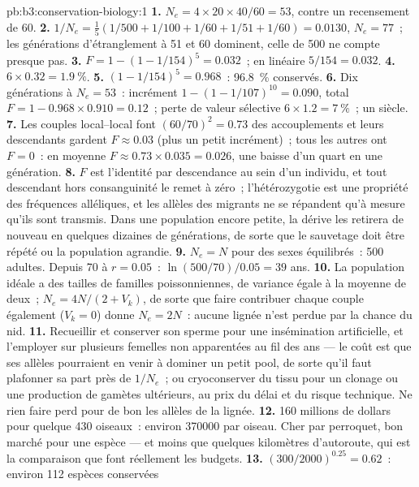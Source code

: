 \begin{solution}{pb:b3:conservation-biology:1}
\textbf{1.} $N_{e} = 4\times 20\times 40/60 = 53$, contre un recensement de 60.
\textbf{2.} $1/N_{e} = \tfrac{1}{5}(1/500 + 1/100 + 1/60 + 1/51 + 1/60) =
0.0130$, $N_{e} = 77$~; les générations d'étranglement à 51 et 60
dominent, celle de 500 ne compte presque pas.
\textbf{3.} $F = 1 - (1 - 1/154)^{5} = 0.032$~; en linéaire $5/154 = 0.032$.
\textbf{4.} $6\times 0.32 = \qty{1.9}{\%}$.
\textbf{5.} $(1 - 1/154)^{5} = 0.968$~: \qty{96.8}{\%} conservés.
\textbf{6.} Dix générations à $N_{e} = 53$~: incrément $1 - (1 -
1/107)^{10} = 0.090$, total $F = 1 - 0.968\times 0.910 = 0.12$~; perte de
valeur sélective $6\times 1.2 = \qty{7}{\%}$~; un siècle.
\textbf{7.} Les couples local--local font $(60/70)^{2} = 0.73$ des
accouplements et leurs descendants gardent $F \approx 0.03$ (plus un
petit incrément)~; tous les autres ont $F = 0$~: en moyenne
$F \approx 0.73\times 0.035 = 0.026$, une baisse d'un quart en une
génération.
\textbf{8.} $F$ est l'identité par descendance au sein d'un individu, et
tout descendant hors consanguinité le remet à zéro~; l'hétérozygotie est
une propriété des fréquences alléliques, et les allèles des migrants ne
se répandent qu'à mesure qu'ils sont transmis. Dans une population
encore petite, la dérive les retirera de nouveau en quelques dizaines de
générations, de sorte que le sauvetage doit être répété ou la population
agrandie.
\textbf{9.} $N_{e} = N$ pour des sexes équilibrés~: 500 adultes. Depuis
70 à $r =
0.05$~: $\ln(500/70)/0.05 = 39$ ans.
\textbf{10.} La population idéale a des tailles de familles
poissonniennes, de variance égale à la moyenne de deux~;
$N_{e} = 4N/(2 + V_{k})$, de sorte que faire contribuer chaque couple
également ($V_{k} = 0$) donne $N_{e} = 2N$~: aucune lignée n'est perdue
par la chance du nid.
\textbf{11.} Recueillir et conserver son sperme pour une insémination
artificielle, et l'employer sur plusieurs femelles non apparentées au
fil des ans --- le coût est que ses allèles pourraient en venir à
dominer un petit pool, de sorte qu'il faut plafonner sa part près de
$1/N_{e}$~; ou cryoconserver du tissu pour un clonage ou une production
de gamètes ultérieurs, au prix du délai et du risque technique. Ne rien
faire perd pour de bon les allèles de la lignée.
\textbf{12.} \qty{160}{} millions de dollars pour quelque 430 oiseaux~:
environ \num{370000} par oiseau. Cher par perroquet, bon marché pour une
espèce --- et moins que quelques kilomètres d'autoroute, qui est la
comparaison que font réellement les budgets.
\textbf{13.} $(300/2000)^{0.25} = 0.62$~: environ 112 espèces conservées

\end{solution}
